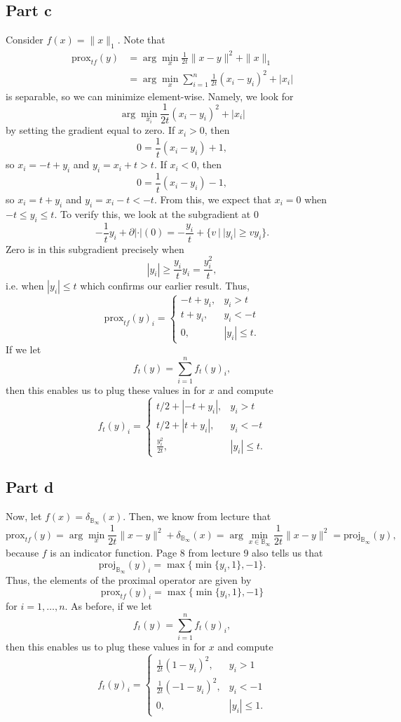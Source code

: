 \documentclass{article}
\newcommand{\prox}{\mathrm{prox}}
\begin{document}
\subsection{Part c}
Consider $f(x)=\|x\|_1$. Note that 
\begin{align*}
\prox_{t f}(y) &= \arg\min_{x} \frac{1}{2t}\|x-y\|^2 + \|x\|_1\\&=
\arg\min_{x}\sum_{i=1}^n\frac{1}{2t}(x_i-y_i)^2+|x_i|
\end{align*}
is separable, so we can minimize element-wise. Namely, we look for 
\[
\arg\min_{x_i}\frac{1}{2t}(x_i-y_i)^2+|x_i|
\]
by setting the gradient equal to zero. If $x_i>0$, then
\[
0=\frac{1}{t}(x_i-y_i)+1,
\]
so $x_i=-t+y_i$ and $y_i=x_i+t>t$. If $x_i<0$, then
\[
0=\frac{1}{t}(x_i-y_i)-1,
\]
so $x_i=t+y_i$ and $y_i=x_i-t<-t$. From this, we expect that $x_i=0$ when $-t\leq y_i\leq t$. To verify this, we look at the subgradient at 0
\[
-\frac{1}{t}y_i+\partial|\cdot|(0)=-\frac{y_i}{t}+\{v~|~|y_i|\geq vy_i\}.
\]
Zero is in this subgradient precisely when 
\[
|y_i|\geq\frac{y_i}{t}y_i=\frac{y_i^2}{t},
\]
i.e. when $|y_i|\leq t$ which confirms our earlier result. Thus, 
\[
\prox_{t f}(y)_i=\begin{cases}
-t+y_i, &y_i>t\\
t+y_i, &y_i<-t\\
0, &|y_i|\leq t.
\end{cases}
\]
If we let 
\[
f_t(y)=\sum_{i=1}^nf_t(y)_i,
\]
then this enables us to plug these values in for $x$ and compute
\[
f_t(y)_i=\begin{cases}
t/2+|-t+y_i|, &y_i>t\\
t/2+|t+y_i|, &y_i<-t\\
\frac{y_i^2}{2t}, &|y_i|\leq t.
\end{cases}
\]

\subsection{Part d}
Now, let $f(x) = \delta_{\mathbb{B}_{\infty}}(x)$. Then, we know from lecture that
\[
\prox_{tf}(y)=\arg\min_{x} \frac{1}{2t}\|x-y\|^2 + \delta_{\mathbb{B}_{\infty}}(x)=\arg\min_{x\in\mathbb{B}_{\infty}} \frac{1}{2t}\|x-y\|^2 =\text{proj}_{\mathbb{B}_{\infty}}(y),
\]
because $f$ is an indicator function. Page 8 from lecture 9 also tells us that
\[
\text{proj}_{\mathbb{B}_{\infty}}(y)_i=\max\{\min\{y_i,1\},-1\}.
\]
Thus, the elements of the proximal operator are given by
\[
\prox_{tf}(y)_i=\max\{\min\{y_i,1\},-1\}
\]
for $i=1,\ldots,n$. As before, if we let
\[
f_t(y)=\sum_{i=1}^nf_t(y)_i,
\]
then this enables us to plug these values in for $x$ and compute
\[
f_t(y)_i=\begin{cases}
\frac{1}{2t}(1-y_i)^2, &y_i>1\\
\frac{1}{2t}(-1-y_i)^2, &y_i<-1\\
0, &|y_i|\leq 1.
\end{cases}
\]
\end{document}
